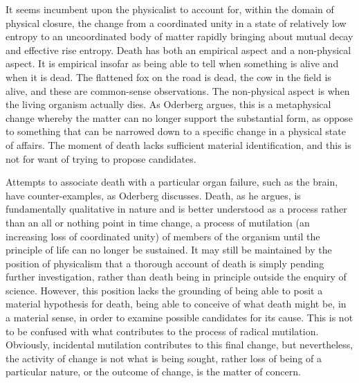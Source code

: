 It seems incumbent upon the physicalist to account for, within the domain of physical closure, the change from a coordinated unity in a state of relatively low entropy to an uncoordinated body of matter rapidly bringing about mutual decay and effective rise entropy.
Death has both an empirical aspect and a non-physical aspect. It is empirical insofar as being able to tell when something is alive and when it is dead. The flattened fox on the road is dead, the cow in the field is alive, and these are common-sense observations. The non-physical aspect is when the living organism actually dies. As Oderberg argues, this is a metaphysical change whereby the matter can no longer support the substantial form, as oppose to something that can be narrowed down to a specific change in a physical state of affairs. \parencite[][]{Oderberg2017Death} The moment of death lacks sufficient material identification, and this is not for want of trying to propose candidates.

Attempts to associate death with a particular organ failure, such as the brain, have counter-examples, as Oderberg discusses. Death, as he argues, is fundamentally qualitative in nature and is better understood as a process rather than an all or nothing point in time change, a process of mutilation (an increasing loss of coordinated unity) of members of the organism until the principle of life can no longer be sustained. It may still be maintained by the position of physicalism that a thorough account of death is simply pending further investigation, rather than death being in principle outside the enquiry of science. However, this position lacks the grounding of being able to posit a material hypothesis for death, being able to conceive of what death might be, in a material sense, in order to examine possible candidates for its cause. This is not to be confused with what contributes to the process of radical mutilation. Obviously, incidental mutilation contributes to this final change, but nevertheless, the activity of change is not what is being sought, rather loss of being of a particular nature, or the outcome of change, is the matter of concern.


